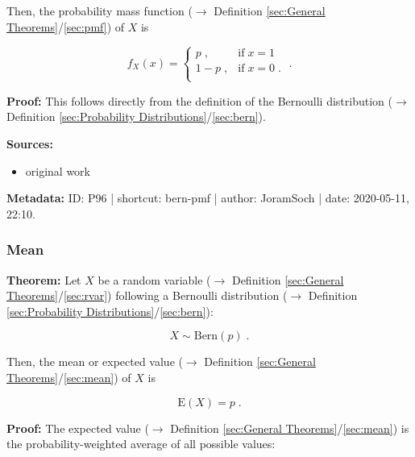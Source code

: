 \documentclass[a4paper,12pt,twoside]{book}
\begin{document}
Then, the probability mass function ($\rightarrow$ Definition \ref{sec:General Theorems}/\ref{sec:pmf}) of $X$ is

\begin{equation} \label{eq:bern-pmf-Bern-pmf}
f_X(x) = \left\{
\begin{array}{rl}
p \; , & \text{if} \; x = 1 \\
1-p \; , & \text{if} \; x = 0 \; . \\
\end{array}
\right. \; .
\end{equation}


\vspace{1em}
\textbf{Proof:} This follows directly from the definition of the Bernoulli distribution ($\rightarrow$ Definition \ref{sec:Probability Distributions}/\ref{sec:bern}).


\vspace{1em}
\textbf{Sources:}
\begin{itemize}
\item original work\end{itemize}


\vspace{1em}
\textbf{Metadata:} ID: P96 | shortcut: bern-pmf | author: JoramSoch | date: 2020-05-11, 22:10.
\vspace{1em}



\subsubsection[\textbf{Mean}]{Mean} \label{sec:bern-mean}
\setcounter{equation}{0}

\textbf{Theorem:} Let $X$ be a random variable ($\rightarrow$ Definition \ref{sec:General Theorems}/\ref{sec:rvar}) following a Bernoulli distribution ($\rightarrow$ Definition \ref{sec:Probability Distributions}/\ref{sec:bern}):

\begin{equation} \label{eq:bern-mean-bern}
X \sim \mathrm{Bern}(p) \; .
\end{equation}

Then, the mean or expected value ($\rightarrow$ Definition \ref{sec:General Theorems}/\ref{sec:mean}) of $X$ is

\begin{equation} \label{eq:bern-mean-bern-mean}
\mathrm{E}(X) = p \; .
\end{equation}


\vspace{1em}
\textbf{Proof:} The expected value ($\rightarrow$ Definition \ref{sec:General Theorems}/\ref{sec:mean}) is the probability-weighted average of all possible values:
\end{document}
